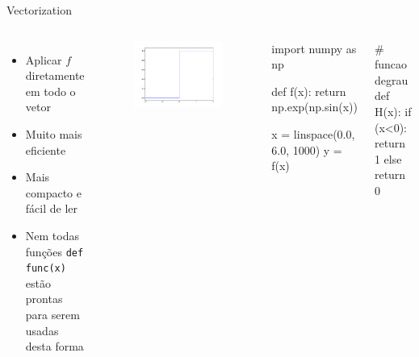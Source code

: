 \documentclass[12pt,t,graphics]{beamer}
\begin{document}
\begin{frame}[t,fragile]{Vectorization}  
	\vspace{-0.5cm}
	\begin{columns}   
		\begin{itemize}
			\item Aplicar $f$ diretamente em todo o vetor
			\item Muito mais eficiente
			\item Mais compacto e fácil de ler
			\item Nem todas funções \texttt{def func(x)} estão prontas
			para serem usadas desta forma
		\end{itemize}
		\vspace{-0.5cm}
		\begin{figure}
			\centering
			\includegraphics[scale=0.2]{img/hv.png}
		\end{figure}
		\begin{python}
import numpy as np
		
def f(x):
    return np.exp(np.sin(x))
		
x = linspace(0.0, 6.0, 1000)
y = f(x)
\end{python}
		\pause
		\begin{python}
# funcao degrau 
def H(x):
    if (x<0):
	    return 1
    else 
        return 0
		\end{python}
	\end{columns}
\end{frame}
\end{document}
